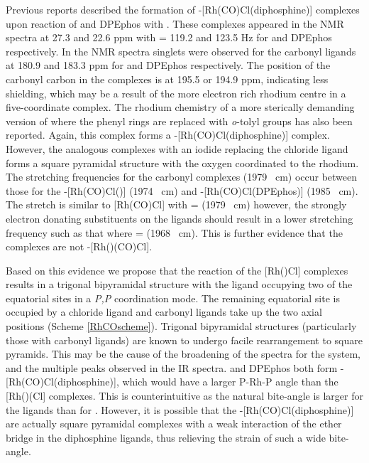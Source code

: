 Previous reports described the formation of \trans-{[Rh(CO)Cl(diphosphine)]} complexes upon reaction of \Phxantphos{} and DPEphos with .\cite{Deb2010}  These complexes appeared in the \phosphorus{} NMR spectra at 27.3 and 22.6 ppm with \JRhP{} = 119.2 and 123.5 Hz for \Phxantphos{} and DPEphos respectively.  In the \carbon{} NMR spectra singlets were observed for the carbonyl ligands at 180.9 and 183.3 ppm for \Phxantphos{} and DPEphos respectively.  The position of the carbonyl carbon in the \tBuxantphos{} complexes is at 195.5 or 194.9 ppm, indicating less shielding, which may be a result of the more electron rich rhodium centre in a five-coordinate complex.  The rhodium chemistry of a more sterically demanding version of \Phxantphos{} where the phenyl rings are replaced with \emph{o}-tolyl groups has also been reported.\cite{Williams2011}  Again, this complex forms a \trans-[Rh(CO)Cl(diphosphine)] complex.  However, the analogous complexes with an iodide replacing the chloride ligand forms a square pyramidal structure with the oxygen coordinated to the rhodium.  The  stretching frequencies for the \tBuxantphos{} carbonyl complexes (1979 \si{\per\centi\metre}) occur between those for the \trans-[Rh(CO)Cl(\Phxantphos)] (1974 \si{\per\centi\metre}) and \trans-[Rh(CO)Cl(DPEphos)] (1985 \si{\per\cm}).  The  stretch is similar to [Rh(CO)Cl] with  =  (1979 \si{\per\centi\metre}) however, the strongly electron donating \tBu{} substituents on the \tBuxantphos{} ligands should result in a lower stretching frequency such as that where  =  (1968 \si{\per\cm}).\cite{Banger2009}  This is further evidence that the \tBuxantphos{} complexes are not \trans-[Rh(\tBuxantphos)(CO)Cl].  


Based on this evidence we propose that the reaction of the [Rh(\tBuxantphos)Cl] complexes results in a trigonal bipyramidal structure with the \tBuxantphos{} ligand occupying two of the equatorial sites in a \dento{}\emph{P,P}\textprime{} coordination mode.  The remaining equatorial site is occupied by a chloride ligand and carbonyl ligands take up the two axial positions (Scheme \ref{RhCOscheme}).  Trigonal bipyramidal structures (particularly those with carbonyl ligands) are known to undergo facile rearrangement to square pyramids.\cite{Sanger1985} This may be the cause of the broadening of the spectra for the \tButhixantphos{} system, and the multiple peaks observed in the \gls{IR} spectra.  \Phxantphos{} and DPEphos both form \trans{}-[Rh(CO)Cl(diphosphine)], which would have a larger P-Rh-P angle than the [Rh(\tBuxantphos)(Cl] complexes.  This is counterintuitive as the natural bite-angle is larger for the \tBuxantphos{} ligands than for \Phxantphos{}.  However, it is possible that the \trans{}-[Rh(CO)Cl(diphosphine)] are actually square pyramidal complexes with a weak interaction of the ether bridge in the diphosphine ligands, thus relieving the strain of such a wide bite-angle.

